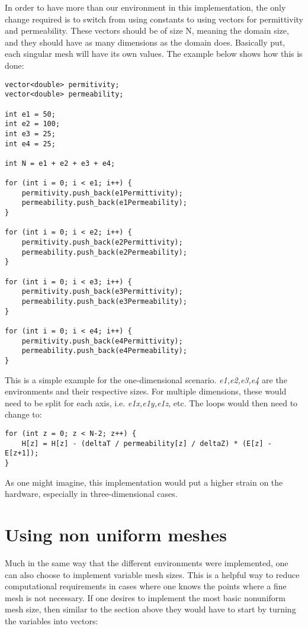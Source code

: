In order to have more than our environment in this implementation, the only change required is to switch from using constants to using vectors for permittivity and permeability. These vectors should be of size N, meaning the domain size, and they should have as many dimensions as the domain does. Basically put, each singular mesh will have its own values. The example below shows how this is done:

\begin{verbatim}
vector<double> permitivity;
vector<double> permeability;

int e1 = 50;
int e2 = 100;
int e3 = 25;
int e4 = 25;

int N = e1 + e2 + e3 + e4;

for (int i = 0; i < e1; i++) {
	permitivity.push_back(e1Permittivity);
	permeability.push_back(e1Permeability);
}

for (int i = 0; i < e2; i++) {
	permitivity.push_back(e2Permittivity);
	permeability.push_back(e2Permeability);
}

for (int i = 0; i < e3; i++) {
	permitivity.push_back(e3Permittivity);
	permeability.push_back(e3Permeability);
}

for (int i = 0; i < e4; i++) {
	permitivity.push_back(e4Permittivity);
	permeability.push_back(e4Permeability);
}
\end{verbatim}

This is a simple example for the one-dimensional scenario. \textit{e1,e2,e3,e4} are the environments and their respective sizes. For multiple dimensions, these would need to be split for each axis, i.e. \textit{e1x,e1y,e1z}, etc. The loops would then need to change to:

\begin{verbatim}
for (int z = 0; z < N-2; z++) {
	H[z] = H[z] - (deltaT / permeability[z] / deltaZ) * (E[z] - E[z+1]);
}
\end{verbatim}

As one might imagine, this implementation would put a higher strain on the hardware, especially in three-dimensional cases.

\section{Using non uniform meshes}

Much in the same way that the different environments were implemented, one can also choose to implement variable mesh sizes. This is a helpful way to reduce computational requirements in cases where one knows the points where a fine mesh is not necessary. If one desires to implement the most basic nonuniform mesh size, then similar to the section above they would have to start by turning the variables into vectors:

